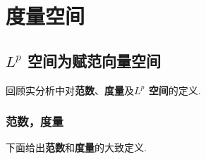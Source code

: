\ifx\allfiles\undefined


	\else
	\fi
\chapter{度量空间}

\section{$L^p$ 空间为赋范向量空间}
\begin{center}
	回顾实分析中对\textbf{范数}、\textbf{度量}及\textbf{$L^p$ 空间}的定义.
\end{center}
	
\subsection{范数，度量}
	下面给出\textbf{范数}和\textbf{度量}的大致定义.
